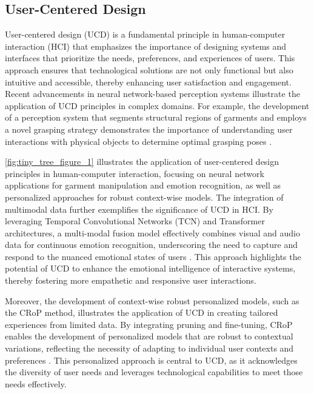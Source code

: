 \subsection{User-Centered Design} \label{subsec:User-Centered Design}

User-centered design (UCD) is a fundamental principle in human-computer interaction (HCI) that emphasizes the importance of designing systems and interfaces that prioritize the needs, preferences, and experiences of users. This approach ensures that technological solutions are not only functional but also intuitive and accessible, thereby enhancing user satisfaction and engagement. Recent advancements in neural network-based perception systems illustrate the application of UCD principles in complex domains. For example, the development of a perception system that segments structural regions of garments and employs a novel grasping strategy demonstrates the importance of understanding user interactions with physical objects to determine optimal grasping poses \cite{chen2023learninggraspclothingstructural}. 

\autoref{fig:tiny_tree_figure_1} illustrates the application of user-centered design principles in human-computer interaction, focusing on neural network applications for garment manipulation and emotion recognition, as well as personalized approaches for robust context-wise models. The integration of multimodal data further exemplifies the significance of UCD in HCI. By leveraging Temporal Convolutional Networks (TCN) and Transformer architectures, a multi-modal fusion model effectively combines visual and audio data for continuous emotion recognition, underscoring the need to capture and respond to the nuanced emotional states of users \cite{zhou2023leveragingtcntransformereffective}. This approach highlights the potential of UCD to enhance the emotional intelligence of interactive systems, thereby fostering more empathetic and responsive user interactions.

Moreover, the development of context-wise robust personalized models, such as the CRoP method, illustrates the application of UCD in creating tailored experiences from limited data. By integrating pruning and fine-tuning, CRoP enables the development of personalized models that are robust to contextual variations, reflecting the necessity of adapting to individual user contexts and preferences \cite{kaur2024cropcontextwiserobuststatic}. This personalized approach is central to UCD, as it acknowledges the diversity of user needs and leverages technological capabilities to meet those needs effectively.

